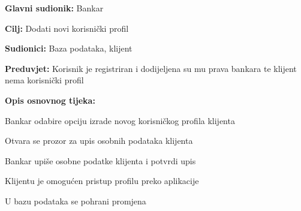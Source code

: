             \noindent {}
            \begin{packed_item}
                
                  \item \textbf{Glavni sudionik: }Bankar
                  \item  \textbf{Cilj:} Dodati novi korisnički profil
                  \item  \textbf{Sudionici:} Baza podataka, klijent
                  \item  \textbf{Preduvjet:} Korisnik je registriran i dodijeljena su mu prava bankara te klijent nema korisnički profil
                  \item  \textbf{Opis osnovnog tijeka:}
                  
                  \item[] \begin{packed_enum}
                
                    \item  Bankar odabire opciju izrade novog korisničkog profila klijenta
                    \item  Otvara se prozor za upis osobnih podataka klijenta
                    \item  Bankar upiše osobne podatke klijenta i potvrdi upis
                    \item  Klijentu je omogućen pristup profilu preko aplikacije
                    \item  U bazu podataka se pohrani promjena
                  \end{packed_enum}
                  
                \end{packed_item}
                
